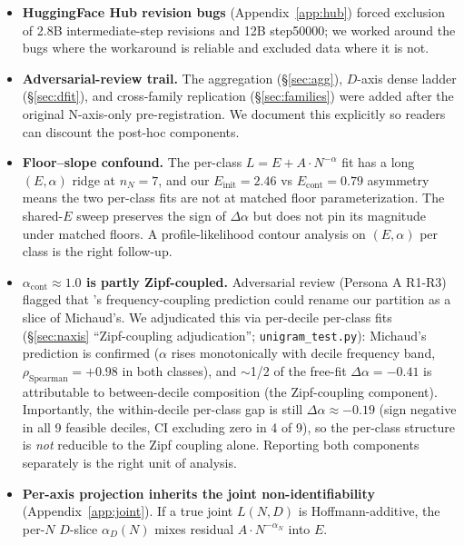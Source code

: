 \documentclass[10pt]{article}
\newcommand{\dalpha}{\Delta\alpha}
\newcommand{\acont}{\alpha_\mathrm{cont}}
\begin{document}
\begin{itemize}
  \item \textbf{HuggingFace Hub revision bugs} (Appendix~\ref{app:hub})
        forced exclusion of 2.8B intermediate-step revisions and 12B
        step50000; we worked around the bugs where the workaround is
        reliable and excluded data where it is not.
  \item \textbf{Adversarial-review trail.} The aggregation
        (\S\ref{sec:agg}), $D$-axis dense ladder (\S\ref{sec:dfit}),
        and cross-family replication (\S\ref{sec:families}) were added
        after the original N-axis-only pre-registration. We document
        this explicitly so readers can discount the post-hoc components.
  \item \textbf{Floor--slope confound.} The per-class
        $L = E + A \cdot N^{-\alpha}$ fit has a long $(E, \alpha)$ ridge
        at $n_N{=}7$, and our $E_\mathrm{init} = 2.46$ vs
        $E_\mathrm{cont} = 0.79$ asymmetry means the two per-class
        fits are not at matched floor parameterization. The shared-$E$
        sweep preserves the sign of $\dalpha$ but does not pin its
        magnitude under matched floors. A profile-likelihood contour
        analysis on $(E, \alpha)$ per class is the right follow-up.
  \item \textbf{$\acont \approx 1.0$ is partly Zipf-coupled.} Adversarial
        review (Persona A R1-R3) flagged that
        \citet{michaud2023quantization}'s frequency-coupling prediction
        could rename our partition as a slice of Michaud's. We
        adjudicated this via per-decile per-class fits
        (\S\ref{sec:naxis} ``Zipf-coupling adjudication'';
        \texttt{unigram\_test.py}): Michaud's prediction is confirmed
        ($\alpha$ rises monotonically with decile frequency band,
        $\rho_\mathrm{Spearman} = +0.98$ in both classes), and
        $\sim$1/2 of the free-fit $\dalpha = -0.41$ is attributable
        to between-decile composition (the Zipf-coupling component).
        Importantly, the within-decile per-class gap is still
        $\dalpha \approx -0.19$ (sign negative in all 9 feasible
        deciles, CI excluding zero in 4 of 9), so the per-class
        structure is \emph{not} reducible to the Zipf coupling alone.
        Reporting both components separately is the right unit of
        analysis.
  \item \textbf{Per-axis projection inherits the joint
        non-identifiability} (Appendix~\ref{app:joint}). If a true
        joint $L(N, D)$ is Hoffmann-additive, the per-$N$ $D$-slice
        $\alpha_D(N)$ mixes residual $A \cdot N^{-\alpha_N}$ into $E$.

\end{itemize}
\end{document}
